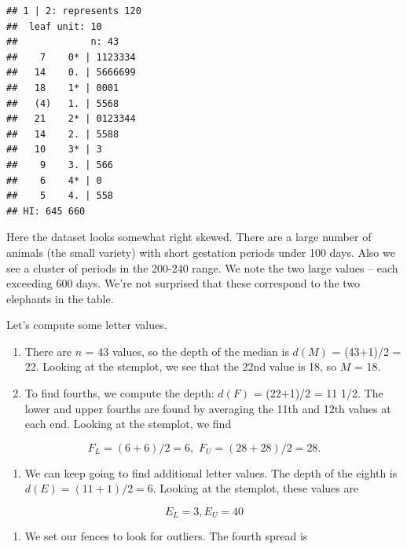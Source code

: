 \documentclass[
]{book}
\newenvironment{Shaded}{\begin{snugshade}}{\end{snugshade}}
\newcommand{\FunctionTok}[1]{\textcolor[rgb]{0.00,0.00,0.00}{#1}}
\newcommand{\NormalTok}[1]{#1}
\newcommand{\SpecialCharTok}[1]{\textcolor[rgb]{0.00,0.00,0.00}{#1}}
\providecommand{\tightlist}{%
  \setlength{\itemsep}{0pt}\setlength{\parskip}{0pt}}
\begin{document}
\begin{Shaded}
\end{Shaded}

\begin{verbatim}
## 1 | 2: represents 120
##  leaf unit: 10
##             n: 43
##    7    0* | 1123334
##   14    0. | 5666699
##   18    1* | 0001
##   (4)   1. | 5568
##   21    2* | 0123344
##   14    2. | 5588
##   10    3* | 3
##    9    3. | 566
##    6    4* | 0
##    5    4. | 558
## HI: 645 660
\end{verbatim}

Here the dataset looks somewhat right skewed. There are a large number of animals (the small variety) with short gestation periods under 100 days. Also we see a cluster of periods in the 200-240 range. We note the two large values -- each exceeding 600 days. We're not surprised that these correspond to the two elephants in the table.

Let's compute some letter values.

\begin{enumerate}
\def\labelenumi{\arabic{enumi}.}
\item
  There are \(n\) = 43 values, so the depth of the median is \(d(M)\) = (43+1)/2 = 22. Looking at the stemplot, we see that the 22nd value is 18, so \(M\) = 18.
\item
  To find fourths, we compute the depth: \(d(F)\) = (22+1)/2 = 11 1/2. The lower and upper fourths are found by averaging the 11th and 12th values at each end. Looking at the stemplot, we find
\end{enumerate}

\[
          F_L = (6 + 6)/2 = 6, \, \,   F_U = (28+28)/2 = 28 .
\]

\begin{enumerate}
\def\labelenumi{\arabic{enumi}.}
\setcounter{enumi}{2}
\tightlist
\item
  We can keep going to find additional letter values. The depth of the eighth is \(d(E) = (11+1)/2 = 6\). Looking at the stemplot, these values are
\end{enumerate}

\[
          E_L = 3,  E_U = 40
\]

\begin{enumerate}
\def\labelenumi{\arabic{enumi}.}
\setcounter{enumi}{3}
\tightlist
\item
  We set our fences to look for outliers. The fourth spread is
\end{enumerate}
\end{document}
